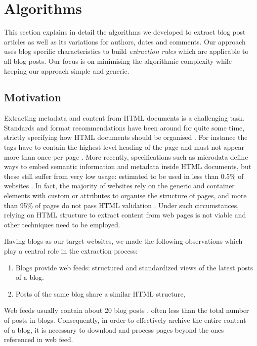 \section{Algorithms}
\label{algorithms}

This section explains in detail the algorithms we developed to extract blog post articles as well as its variations for authors, dates and comments. Our approach uses blog specific characteristics to build \emph{extraction rules} which are applicable to all blog posts. Our focus is on minimising the algorithmic complexity while keeping our approach simple and generic.


\subsection{Motivation}
\label{motivation}

Extracting metadata and content from HTML documents is a challenging task. Standards and format recommendations have been around for quite some time, strictly specifying how HTML documents should be organised \cite{w3c2014}. For instance the  tags have to contain the highest-level heading of the page and must not appear more than once per page \cite{w3c2002}. More recently, specifications such as microdata \cite{whatwg2014} define ways to embed semantic information and metadata inside HTML documents, but these still suffer from very low usage: estimated to be used in less than 0.5\% of websites \cite{andrewrogers2014}. In fact, the majority of websites rely on the generic  and  container elements with custom  or  attributes to organise the structure of pages, and more than 95\% of pages do not pass HTML validation \cite{brianwilson2008}. Under such circumstances, relying on HTML structure to extract content from web pages is not viable and other techniques need to be employed.


Having blogs as our target websites, we made the following observations which play a central role in the extraction process:
\begin{enumerate}[label={(\alph*)}]
  \item\label{havefeedAssum} Blogs provide web feeds: structured and standardized views of the latest posts of a blog.
  \item\label{similarhtmlAssum} Posts of the same blog share a similar HTML structure,
\end{enumerate}
Web feeds usually contain about 20 blog posts \cite{oita2010}, often less than the total number of posts in blogs. Consequently, in order to effectively archive the entire content of a blog, it is necessary to download and process pages beyond the ones referenced in web feed.


